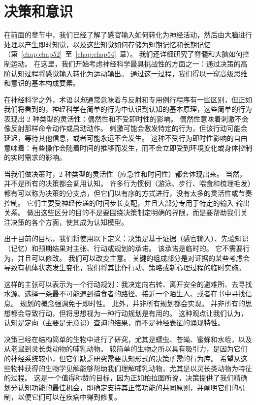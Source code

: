 \chapter{决策和意识} \label{chap:chap56}

在前面的章节中，我们已经了解了感官输入如何转化为神经活动，然后由大脑进行处理以产生即时知觉，以及这些知觉如何存储为短期记忆和长期记忆（第~\ref{chap:chap52}~至~\ref{chap:chap54}~章）。
我们还详细研究了脊髓和大脑如何控制运动。
在这里，我们开始考虑神经科学最具挑战性的方面之一：通过决策的高阶认知过程将感觉输入转化为运动输出。
通过这一过程，我们得以一窥高级思维和意识的基本构成要素。


在神经科学之外，术语\textit{认知}通常意味着与反射和专用例行程序有一些区别，但正如我们将看到的，神经科学在简单的行为中认识到认知的基本原理，这些简单的行为表现出 2 种类型的灵活性：偶然性和不受即时性的影响。
偶然性意味着刺激不会像反射那样命令动作或启动动作。
刺激可能会激发特定的行为，但该行动可能会延迟，等待其他信息，或者可能永远不会发生。
这种不受行为即时性影响的自由意味着：有些操作会随着时间的推移而发生，而不会立即受到环境变化或身体控制的实时需求的影响。


当我们做决策时，2 种类型的灵活性（应急性和时间性）都会体现出来。
当然，并不是所有的决策都会调用认知。
许多行为惯例（游泳、步行、喂食和梳理毛发）都有可以称为决策的分支点，但它们以有序的方式进行，没有太多的灵活性或节奏控制。
它们主要受神经传递的时间步长支配，并且大部分专用于特定的输入-输出关系。
做出这些区分的目的不是要围绕决策制定明确的界限，而是要帮助我们关注决策的各个方面，使其成为认知模型。


出于目前的目标，我们将使用以下定义：决策是基于证据（感官输入）、先验知识（记忆）和预期结果对主张、行动或规划的承诺。
该承诺是临时的。
它不需要行为，并且可以修改。
我们可以改变主意。
关键的组成部分是对证据的某些考虑会导致有机体状态发生变化，我们将其比作行动、策略或新心理过程的临时实施。


这样的主张可以表示为一个行动规划：我决定向右转、离开安全的避难所、去寻找水源、选择一条最不可能遇到捕食者的路径、接近一个陌生人、或者在书中寻找信息。
规划的概念强调免于即时性。
此外，并非所有规划都会实现。
并非所有的思想都会导致行动，但将思想视为一种行动规划是有用的。
这种观点让我们认为，认知是定向（主要是无意识）查询的结果，而不是神经表征的涌现特性。


决策已经在结构简单的生物中进行了研究，尤其是蠕虫、苍蝇、蜜蜂和水蛭，以及从老鼠到灵长类动物的哺乳动物。
较简单的生物之所以具有吸引力，是因为它们的神经系统较小，但它们缺乏研究需要认知形式的决策所需的行为库。
希望从这些物种获得的生物学见解能够帮助我们理解哺乳动物，尤其是以灵长类动物为特征的过程。
这是一个值得称赞的目标，因为正如柏拉图所说，决策提供了我们精确划分认知功能的最佳机会，即确定支持其正常功能的共同原则，并阐明它们的机制，以便它们可以在疾病中得到修复。



